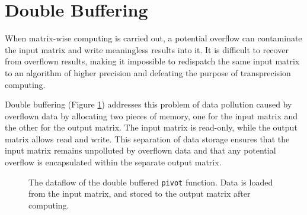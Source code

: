 \documentclass[logo,bsc,singlespacing,parskip]{infthesis}
\newcommand{\pivot}{\texttt{pivot}}
\begin{document}
\section{Double Buffering}

When matrix-wise computing is carried out, a potential overflow can contaminate
the input matrix and write meaningless results into it. It is difficult to
recover from overflown results, making it impossible to redispatch the same
input matrix to an algorithm of higher precision and defeating the purpose of
transprecision computing.

Double buffering (Figure \ref{fig:double-buffering}) 
addresses this problem of data pollution
caused by overflown data by allocating two pieces of
memory, one for the input matrix and the other for the output matrix. The input
matrix is read-only, while the output matrix allows read and write.
This separation of data storage ensures that the input matrix remains unpolluted
by overflown data and that any potential overflow is encapsulated within the
separate output matrix. 
\begin{figure}[H]
\centering
{}
\caption{The dataflow of the double buffered \pivot{}
function. Data is loaded from the input matrix, and stored to the output
matrix after computing.}
\label{fig:double-buffering}
\end{figure}
\end{document}
